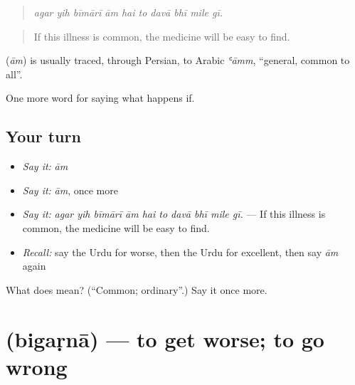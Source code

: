 \begin{quote}
         
\end{quote}

\begin{quote}
\emph{agar yih bīmārī ām hai to davā bhī mile gī.}
\end{quote}

\begin{quote}
If this illness is common, the medicine will be easy to find.
\end{quote}

\begin{cousinweb}
\textbf{} (\emph{ām}) is usually traced, through Persian, to Arabic \emph{ʿāmm}, \textquotedblleft{}general, common to all\textquotedblright{}.
\end{cousinweb}

\begin{grammarlens}[title={What you've built}]
One more word for saying what happens if.
\end{grammarlens}

\subsection*{Your turn}
\begin{itemize}
\raggedright
  \item \emph{Say it:} \emph{ām}
  \item \emph{Say it:} \emph{ām}, once more
  \item \emph{Say it:} \emph{agar yih bīmārī ām hai to davā bhī mile gī.} — If this illness is common, the medicine will be easy to find.
  \item \emph{Recall:} say the Urdu for worse, then the Urdu for excellent, then say \emph{ām} again
\end{itemize}

\begin{tcolorbox}[breakable,colback=teal!4,colframe=teal!35!black,title={Before you move on}]
What does  mean? (\textquotedblleft{}Common; ordinary\textquotedblright{}.) Say it once more.
\end{tcolorbox}
\section[\texorpdfstring{\ur{بگڑنا} (bigaṛnā)}{بگڑنا (bigaṛnā)}]{ (bigaṛnā) — to get worse; to go wrong}

